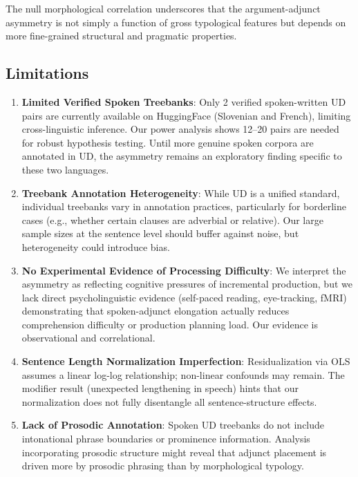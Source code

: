\documentclass[11pt,letterpaper]{article}
\begin{document}
The null morphological correlation underscores that the argument-adjunct asymmetry is not simply a function of gross typological features but depends on more fine-grained structural and pragmatic properties.

\subsection{Limitations}

\begin{enumerate}
  \item \textbf{Limited Verified Spoken Treebanks}: Only 2 verified spoken-written UD pairs are currently available on HuggingFace (Slovenian and French), limiting cross-linguistic inference. Our power analysis shows 12--20 pairs are needed for robust hypothesis testing. Until more genuine spoken corpora are annotated in UD, the asymmetry remains an exploratory finding specific to these two languages.

  \item \textbf{Treebank Annotation Heterogeneity}: While UD is a unified standard, individual treebanks vary in annotation practices, particularly for borderline cases (e.g., whether certain clauses are adverbial or relative). Our large sample sizes at the sentence level should buffer against noise, but heterogeneity could introduce bias.

  \item \textbf{No Experimental Evidence of Processing Difficulty}: We interpret the asymmetry as reflecting cognitive pressures of incremental production, but we lack direct psycholinguistic evidence (self-paced reading, eye-tracking, fMRI) demonstrating that spoken-adjunct elongation actually reduces comprehension difficulty or production planning load. Our evidence is observational and correlational.

  \item \textbf{Sentence Length Normalization Imperfection}: Residualization via OLS assumes a linear log-log relationship; non-linear confounds may remain. The modifier result (unexpected lengthening in speech) hints that our normalization does not fully disentangle all sentence-structure effects.

  \item \textbf{Lack of Prosodic Annotation}: Spoken UD treebanks do not include intonational phrase boundaries or prominence information. Analysis incorporating prosodic structure might reveal that adjunct placement is driven more by prosodic phrasing than by morphological typology.
\end{enumerate}
\end{document}
